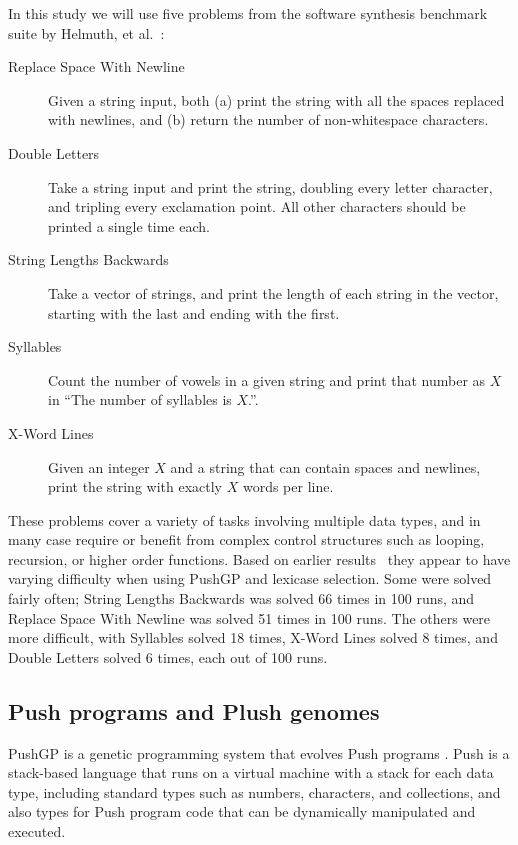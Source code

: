 In this study we will use five problems from the software synthesis 
benchmark suite by Helmuth, et al.~\cite{Helmuth:2015:GECCO}:
\begin{description}
	\item[Replace Space With Newline] Given a string input, both (a) print
	the string with all the spaces replaced with newlines, and (b) return 
	the number of non-whitespace characters.
	\item[Double Letters] Take a string input and print the string, doubling
	every letter character, and tripling every exclamation point. All other
	characters should be printed a single time each.
	\item[String Lengths Backwards] Take a vector of strings, and print the length
	of each string in the vector, starting with the last and ending with the
	first.
	\item[Syllables] Count the number of vowels in a given string and print
	that number as $X$ in ``The number of syllables is $X$.''.
	\item[X-Word Lines] Given an integer $X$ and a string that can contain
	spaces and newlines, print the string with exactly $X$ words per line.
\end{description}
These problems cover a variety of tasks involving multiple data types, and
in many case require or benefit from complex control structures such as
looping, recursion, or higher order functions. Based on earlier 
results~\cite{Helmuth:2015:GECCO} they appear to have varying difficulty
when using PushGP and lexicase selection. Some were solved fairly often; String
Lengths Backwards was solved 66 times in 100 runs, and Replace Space With Newline was solved 51 times in 100 runs. The others were more difficult, with
Syllables solved 18 times, X-Word Lines solved 8  times, and Double Letters
solved 6 times, each out of 100 runs.

\subsection{Push programs and Plush genomes}
\label{sec:PushGPBackground}

PushGP is a genetic programming system that evolves Push programs 
\cite{spector2:2001:gecco,spector:2002:GPEM,push3gecco,Helmuth:2015:dissertation}. 
Push is a stack-based language that runs on a virtual machine with a stack for 
each data type, including standard types such as numbers, characters, and 
collections, and also types for Push program code that can be dynamically 
manipulated and executed. 

